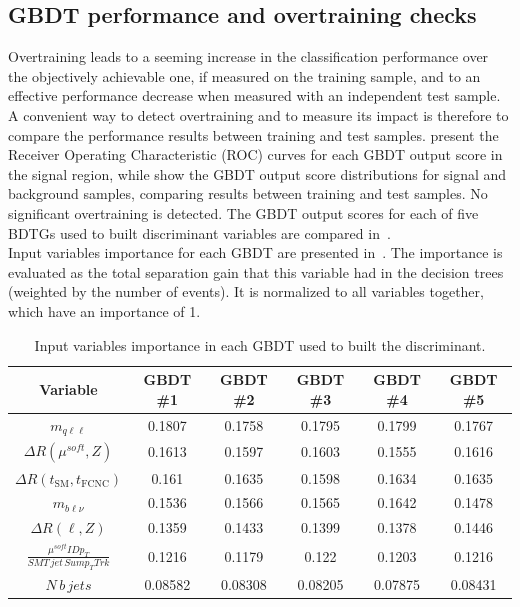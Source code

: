 \subsection {GBDT performance and overtraining checks }
Overtraining  leads  to  a  seeming  increase  in  the  classification performance  over  the
objectively  achievable  one,  if  measured  on  the  training  sample,  and  to  an  effective
performance decrease when measured with an independent test sample.  A convenient way to detect overtraining and to measure its impact is therefore to compare the performance results between training and test samples.  present the Receiver Operating  Characteristic (ROC) curves for each GBDT output score in the signal region, while  show the GBDT output score distributions for signal and background samples, comparing results between training and test samples.
No significant overtraining is detected. The GBDT output scores for each of five BDTGs used to
built discriminant variables are compared in~.  %
\\Input variables importance for each GBDT are presented in~. The importance is evaluated as the total separation gain that this variable had in the decision trees (weighted by the number of events). It is normalized to all variables together, which have an importance of 1.
\begin{table}[!htbp]
	\small
	\centering
	\begin{tabular}{cccccc}
		\toprule
		Variable & GBDT \#1 & GBDT \#2 & GBDT \#3 & GBDT \#4 & GBDT \#5 \\
		\midrule
		$m_{q\ell\ell}$  &  0.1807  &  0.1758  &  0.1795  &  0.1799  &  0.1767  \\ 
		$\Delta R(\mu^{soft},Z)$  &  0.1613  &  0.1597  &  0.1603  &  0.1555  &  0.1616  \\ 
		$\Delta R(t_{\text{SM}},t_{\text{FCNC}})$  &  0.161  &  0.1635  &  0.1598  &  0.1634  &  0.1635  \\ 
		$m_{b\ell\nu}$  &  0.1536  &  0.1566  &  0.1565  &  0.1642  &  0.1478  \\ 
		$\Delta R(\ell,Z)$  &  0.1359  &  0.1433  &  0.1399  &  0.1378  &  0.1446  \\ 
		$\frac{\mu^{soft} ID p_{T}}{SMT\,jet\,Sum p_{T} Trk}$  &  0.1216  &  0.1179  &  0.122  &  0.1203  &  0.1216  \\ 
		$N\,b\,jets$  &  0.08582  &  0.08308  &  0.08205  &  0.07875  &  0.08431  \\ 
		\bottomrule
	\end{tabular}
	\caption{
	Input variables importance in each GBDT used to built the \Dthree discriminant.
}%
\label{tab:D3importance}
\end{table}

